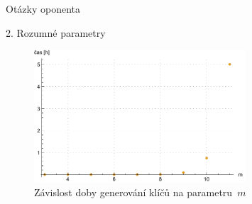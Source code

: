 \documentclass{beamer}
\begin{document}
\begin{frame}{Otázky oponenta}
    \begin{block}{2. Rozumné parametry}

        \begin{figure}
            \centering
            \includegraphics[width=0.7\textwidth]{../../implementace/grafy/listplot_mVelka_generovani.pdf}
            \caption[Časová složitost generování klíčů]{
                Závislost doby generování klíčů na parametru~$m$
            }
        \end{figure}

    \end{block}
\end{frame}

%
%
\end{document}
